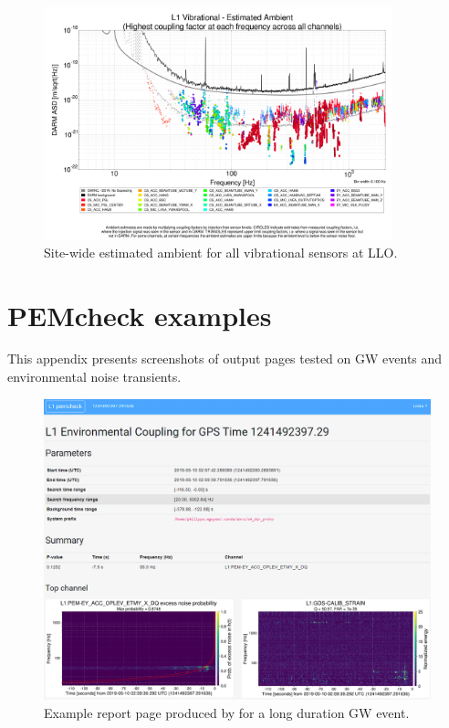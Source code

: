 \begin{figure}
  \centering
  \includegraphics[width=0.9\textwidth]{figures/appendix/pemcoupling-sitewide-ambient.png}
  \caption{Site-wide estimated ambient for all vibrational sensors at LLO.}
  \label{fig:pemcoupling-sitewide-ambient}
\end{figure}


\setcounter{figure}{0}
\setcounter{table}{0}

\chapter{PEMcheck examples}\label{app:pemcheck}

This appendix presents screenshots of  output pages tested on GW events and environmental noise transients.

\begin{figure}[!h]
  \centering
  \includegraphics[width=\textwidth]{figures/appendix/pemcheck-gw190510g.png}
  \caption{Example report page produced by \protect{} for a long duration GW event.}
  \label{fig:pemcheck-GW190510g}
\end{figure}
